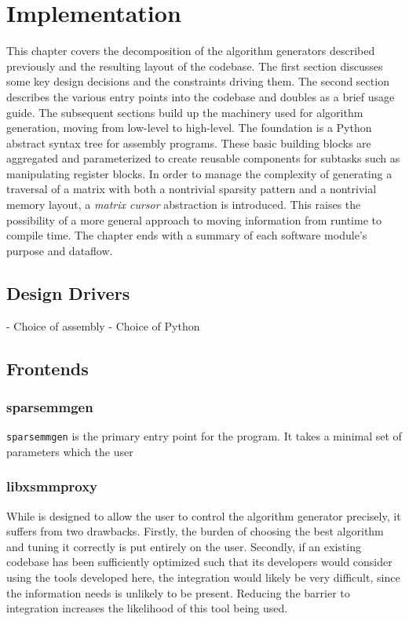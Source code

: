 
\chapter{Implementation}
\label{chapter:implementation}

This chapter covers the decomposition of the algorithm generators described previously and the resulting layout of the codebase. The first section discusses some key design decisions and the constraints driving them. The second section describes the various entry points into the codebase and doubles as a brief usage guide. The subsequent sections build up the machinery used for algorithm generation, moving from low-level to high-level. The foundation is a Python abstract syntax tree for assembly programs. These basic building blocks are aggregated and parameterized to create reusable components for subtasks such as manipulating register blocks. In order to manage the complexity of generating a traversal of a matrix with both a nontrivial sparsity pattern and a nontrivial memory layout, a \emph{matrix cursor} abstraction is introduced. This raises the possibility of a more general approach to moving information from runtime to compile time. The chapter ends with a summary of each software module's purpose and dataflow.

\section{Design Drivers}

- Choice of assembly
- Choice of Python


\section{Frontends}

\subsection{sparsemmgen}

\texttt{sparsemmgen} is the primary entry point for the program. It takes a minimal set of parameters which the user 

\subsection{libxsmmproxy}

While  is designed to allow the user to control the algorithm generator precisely, it suffers from two drawbacks. Firstly, the burden of choosing the best algorithm and tuning it correctly is put entirely on the user. Secondly, if an existing codebase has been sufficiently optimized such that its developers would consider using the tools developed here, the integration would likely be very difficult, since the information  needs is unlikely to be present. Reducing the barrier to integration increases the likelihood of this tool being used.

